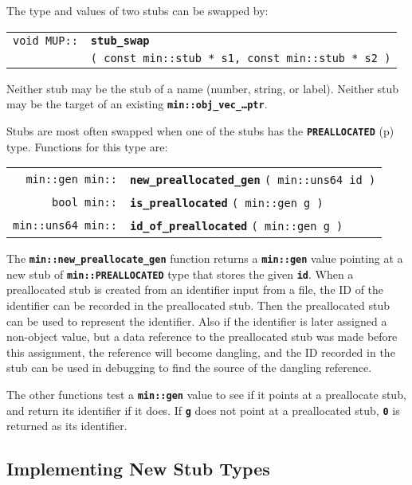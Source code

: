 \documentclass[12pt]{article}
\makeatletter
\newcommand{\TT}[1]{{\tt \bfseries #1}}
\newcommand{\ttindex}[1]{\index{#1@{\tt #1}}}
\newcommand{\pagref}[1]{p\pageref{#1}}
\newenvironment{indpar}[1][0.3in]%
	{\begin{list}{}%
		     {\setlength{\itemsep}{0in}%
		      \setlength{\topsep}{0in}%
		      \setlength{\parsep}{1ex}%
		      \setlength{\labelwidth}{#1}%
		      \setlength{\leftmargin}{#1}%
		      \addtolength{\leftmargin}{\labelsep}}%
	 \item}%
	{\end{list}}
\newcommand{\LABEL}[1]{\label{#1}}
\newlength{\ARGBREAKLENGTH}
\newcommand{\ARGBREAK}[1][\ARGBREAKLENGTH]{\\&\hspace*{#1}}
\newcommand{\MINKEY}[1]%
	   {\TT{#1}\ttindex{min::#1}\ttindex{#1}}
\newcommand{\MUPKEY}[1]%
	   {\TT{#1}\ttindex{MUP::#1}\ttindex{#1}}
\makeatother
\begin{document}
The type and values of two stubs can be swapped by:

\begin{indpar}\begin{tabular}{r@{}l}
\verb|void MUP::| & \MUPKEY{stub\_swap}\ARGBREAK
    \verb|( const min::stub * s1, const min::stub * s2 )|
\LABEL{MUP::STUB_SWAP}
\end{tabular}\end{indpar}

Neither stub may be the stub of a name (number, string, or label).
Neither stub may be the target of an existing
\TT{min::obj\_vec\_\ldots{}ptr}.

Stubs are most often swapped when one of the stubs has the
\TT{PREALLOCATED} (\pagref{MIN::PREALLOCATED}) type.
Functions for this type are:

\begin{indpar}\begin{tabular}{r@{}l}
\verb|min::gen min::| & \MINKEY{new\_preallocated\_gen}
    \verb|( min::uns64 id )|
\LABEL{MIN::NEW_PREALLOCATED_GEN} \\
\verb|bool min::| & \MINKEY{is\_preallocated}
    \verb|( min::gen g )|
\LABEL{MIN::IS_PREALLOCATED} \\
\verb|min::uns64 min::| & \MINKEY{id\_of\_preallocated}
    \verb|( min::gen g )|
\LABEL{MIN::ID_OF_PREALLOCATED} \\
\end{tabular}\end{indpar}

The \TT{min::new\_preallocate\_gen} function returns a
\TT{min::gen} value pointing at a new stub
of \TT{min::PREALLOCATED} type that stores the given \TT{id}.
When a preallocated stub is created from an identifier input
from a file, the ID of the identifier can be recorded in the
preallocated stub.  Then the preallocated stub can be used
to represent the identifier.  Also if the identifier is later
assigned a non-object value, but a data reference to the
preallocated stub was made before this assignment, the reference will become
dangling, and the ID recorded in the stub can be used
in debugging to find the source of the dangling reference.

The other functions test a \TT{min::gen} value to see if
it points at a preallocate stub, and return its identifier
if it does.  If \TT{g} does not point at a preallocated
stub, \TT{0} is returned as its identifier.

\subsection{Implementing New Stub Types}
\label{IMPLEMENTING-NEW-STUB-TYPES}
\end{document}
